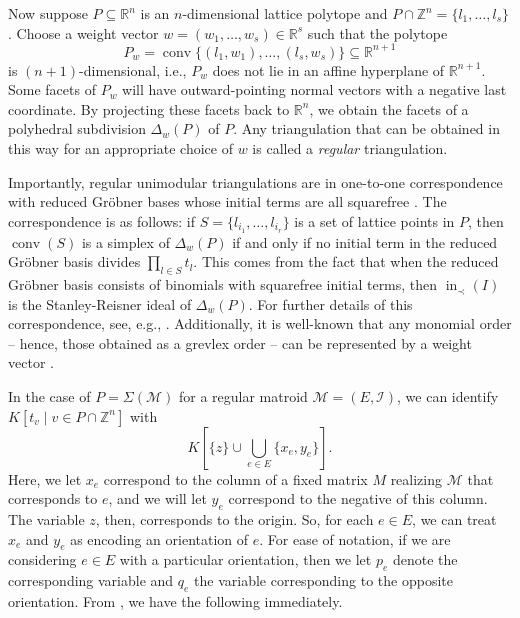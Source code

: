 \documentclass{amsart}
\numberwithin{equation}{section}
\theoremstyle{plain}
\theoremstyle{definition}
\DeclareMathOperator{\conv}{conv}
\DeclareMathOperator{\init}{in}
\newcommand{\RR}{\mathbb{R}}
\newcommand{\ZZ}{\mathbb{Z}}
\newcommand{\calI}{\mathcal{I}}
\newcommand{\calM}{\mathcal{M}}
\begin{document}
Now suppose $P \subseteq \RR^n$ is an $n$-dimensional lattice polytope and $P \cap \ZZ^n = \{l_1,\ldots,l_s\}$.
Choose a weight vector $w = (w_1,\ldots,w_s) \in \RR^s$ such that the polytope
\[ 
    P_w = \conv\{(l_1,w_1),\ldots,(l_s,w_s)\} \subseteq \RR^{n+1}
\]
is $(n+1)$-dimensional, i.e., $P_w$ does not lie in an affine hyperplane of $\RR^{n+1}$.
Some facets of $P_w$ will have outward-pointing normal vectors with a negative last coordinate.
By projecting these facets back to $\RR^n$, we obtain the facets of a polyhedral subdivision $\Delta_w(P)$ of $P$.
Any triangulation that can be obtained in this way for an appropriate choice of $w$ is called a \emph{regular} triangulation.


Importantly, regular unimodular triangulations are in one-to-one correspondence with reduced Gr\"obner bases whose initial terms are all squarefree \cite[Corollary 8.9]{sturmfels}.
The correspondence is as follows: if $S = \{l_{i_1},\dots,l_{i_r}\}$ is a set of lattice points in $P$, then $\conv(S)$ is a simplex of $\Delta_w(P)$ if and only if no initial term in the reduced Gr\"obner basis divides $\prod_{l\in S} t_l$. 
This comes from the fact that when the reduced Gr\"obner basis consists of binomials with squarefree initial terms, then $\init_{\prec}(I)$ is the Stanley-Reisner ideal of $\Delta_w(P)$.
For further details of this correspondence, see, e.g., \cite[Chapter 8]{sturmfels}.
Additionally, it is well-known that any monomial order -- hence, those obtained as a grevlex order -- can be represented by a weight vector \cite[Proposition 1.11]{sturmfels}.


In the case of $P = \Sigma(\calM)$ for a regular matroid $\calM = (E, \calI)$, we can identify $K[t_v \mid v \in P \cap \ZZ^n]$ with 
\begin{equation}\label{eq: semigp}
    K\left[\{z\} \cup \bigcup_{e \in E} \{x_e,y_e\} \right].
\end{equation}
Here, we let $x_e$ correspond to the column of a fixed matrix $M$ realizing $\calM$ that corresponds to $e$, and we will let $y_e$ correspond to the negative of this column.
The variable $z$, then, corresponds to the origin. 
So, for each $e \in E$, we can treat $x_e$ and $y_e$ as encoding an orientation of $e$.
For ease of notation, if we are considering $e \in E$ with a particular orientation, then we let $p_e$ denote the corresponding variable and $q_e$ the variable corresponding to the opposite orientation.
From \cite[Theorem 6.11]{DJKK}, we have the following immediately.
\end{document}
